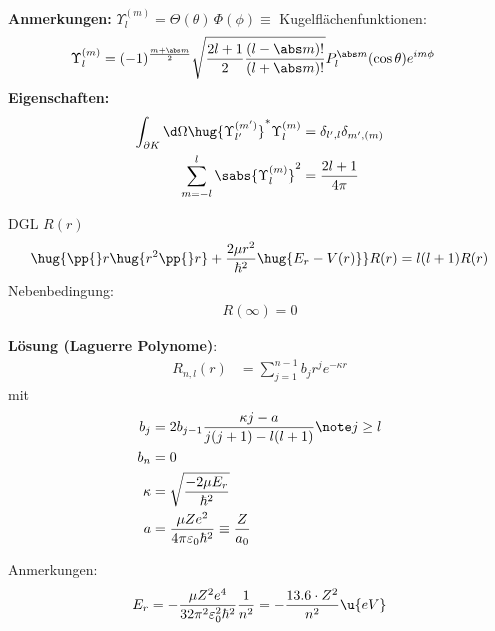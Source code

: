 \documentclass[twocolumn]{summery_4.1}
\begin{document}
\textbf{Anmerkungen:} \(\Upsilon_{l}^{(m)}=\Theta(\theta)\,\Phi(\phi) \equiv\) Kugelflächenfunktionen:
\begin{align*}
    \Upsilon_l^{(m)} &=  (-1)^{\frac{m+\abs m}{2}} \sqrt{\frac{2l +1}{2} \frac{(l - \abs m)!}{(l+\abs m)!}} P_l^{\abs m}(\cos\theta) e^{im\phi}
\end{align*}
\textbf{Eigenschaften:}
\begin{align*}
    \int_{\partial K} \d\Omega \hug{\Upsilon_{l'}^{(m')}}^* \Upsilon_{l}^{(m)} &= \delta_{l',l} \delta_{m',(m)} \\
    \sum_{m=-l}^l \sabs{\Upsilon_{l}^{(m)}}^2 &= \frac{2l + 1}{4\pi}
\end{align*}

{\large DGL $R(r)$}
\begin{align*}
    \hug{\pp{}r \hug{r^2\pp{}r} + \frac{2\mu r^2}{\hbar^2} \hug{E_r - V(r)}} R(r) = l(l+1) R(r)
\end{align*}
Nebenbedingung:
\begin{align*}
    R(\infty) =0
\end{align*}

\textbf{Lösung (Laguerre Polynome)}:
\begin{align*}
    R_{n,l}(r) &=  \sum_{j=1}^{n-1} b_j r^j e^{-\kappa r}
\end{align*}
mit 
\begin{align*}
    b_j &= 2b_{j-1} \frac{\kappa j - a}{j(j+1) - l (l+1)}\note j\ge l\\
    b_n &= 0\\ 
    \kappa &= \sqrt{\frac{-2\mu E_r}{\hbar^2}} \\
    a &= \frac{\mu Z e^2}{4\pi \varepsilon_0 \hbar^2} \equiv  \frac{Z}{a_0}\\
\end{align*}

Anmerkungen:
\begin{align*}
    E_r = -\frac{\mu Z^2 e^4}{32 \pi^2 \varepsilon_0^2 \hbar^2} \frac{1}{n^2} = - \frac{13.6\cdot Z^2}{n^2} \u{eV}
\end{align*}
\end{document}
